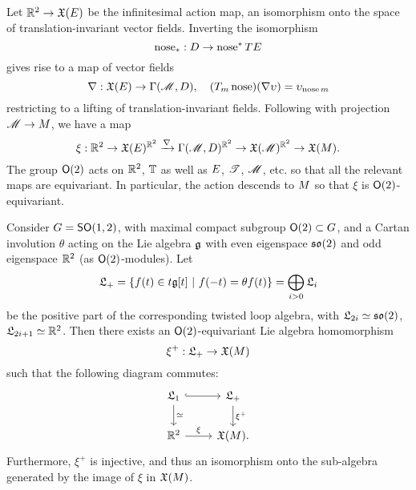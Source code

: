 \subsection{}
Let $\RR^2 \to \XX(\E)$ be the infinitesimal action map, an isomorphism onto
the space of translation-invariant vector fields. Inverting the 
isomorphism
\[
    \nose_* : \D \to \nose^* T\E
\]
gives rise to a map of vector fields
\[
    \nabla : \XX(\E) \to \Gamma(\M,\D),\quad  (T_m \nose)(\nabla\upsilon) = \upsilon_{\nose m}
\]
restricting to a lifting of translation-invariant fields. Following
with projection $\M \to \Mr$, we have a map
\[
        \xi : \RR^2 \to \XX(\E)^{\RR^2} \xrightarrow{\nabla} \Gamma(\M,\D)^{\RR^2} \to \XX(\M)^{\RR^2} \to
        \XX(\Mr).
\]
The group $\O(2)$ acts on $\RR^2$, $\TT$ as well as $\E$, $\S$, $\M$, etc. so that all 
the relevant maps are equivariant. In particular, the action
descends to $\Mr$ so that $\xi$ is $\O(2)$-equivariant.

\begin{thm}\label{thm:main}
       Consider $G = \SO(1,2)$, with maximal compact subgroup
$\O(2) \subset G$, and a Cartan involution $\theta$ acting on the Lie algebra $\fg$
with even eigenspace $\so(2)$ and odd eigenspace $\RR^2$ (as $\O(2)$-modules).
Let 
\[
    \L_+ = \{ f(t) \in t \fg[t]\ |\ f(-t) = \theta f(t) \} = \bigoplus_{i>0} \L_i
\]
be the positive part of the corresponding twisted loop algebra,
with $\L_{2i} \simeq \so(2)$, $\L_{2i+1} \simeq \RR^2$. Then there exists an 
$\O(2)$-equivariant Lie algebra homomorphism 
\[
    \xi^+ : \L_+ \to \XX(\Mr) 
\]
such that the following diagram commutes:
\[\begin{tikzcd}
        \L_1 \arrow[r,hookrightarrow]\arrow[d,"\simeq"] & \L_+ \arrow[d,"\xi^+"]\\
        \RR^2 \arrow[r,"\xi"] & \XX(\Mr).
\end{tikzcd}\]
Furthermore, $\xi^+$ is injective, and thus an isomorphism onto
the sub-algebra generated by the image of $\xi$ in $\XX(\Mr)$.
\end{thm}

